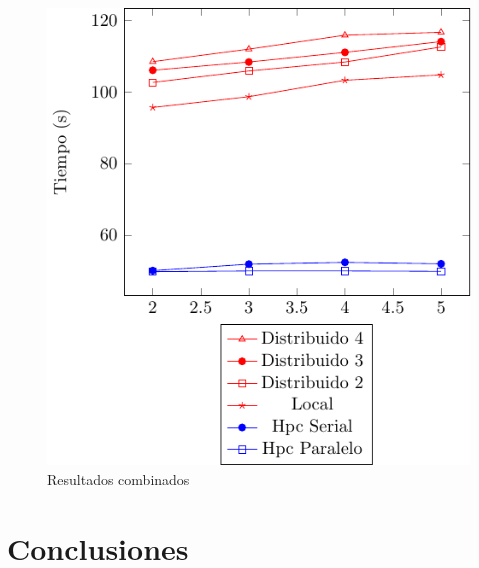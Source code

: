 \documentclass[conference,compsoc]{IEEEtran}
\begin{document}
\begin{figure}[H]
    \centering
    \includegraphics[scale=1]{ResultsCombined.pdf}
    \caption{Resultados combinados}
\end{figure}

\section{Conclusiones}




\end{document}
